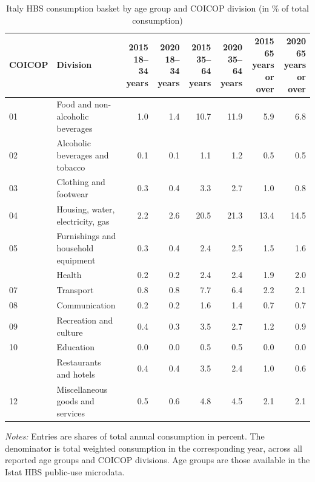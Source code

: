 \begin{landscape}
\begin{table}[H]

\caption{\label{tab:it-hbs-age-coicop}Italy HBS consumption basket by age group and COICOP division (in \% of total consumption)}
\centering
\begin{tabular}[t]{llrrrrrr}
\toprule
COICOP & Division & 2015 18--34 years & 2020 18--34 years & 2015 35--64 years & 2020 35--64 years & 2015 65 years or over & 2020 65 years or over\\
\midrule
01 & Food and non-alcoholic beverages & 1.0 & 1.4 & 10.7 & 11.9 & 5.9 & 6.8\\
02 & Alcoholic beverages and tobacco & 0.1 & 0.1 & 1.1 & 1.2 & 0.5 & 0.5\\
03 & Clothing and footwear & 0.3 & 0.4 & 3.3 & 2.7 & 1.0 & 0.8\\
04 & Housing, water, electricity, gas & 2.2 & 2.6 & 20.5 & 21.3 & 13.4 & 14.5\\
05 & Furnishings and household equipment & 0.3 & 0.4 & 2.4 & 2.5 & 1.5 & 1.6\\
\addlinespace
06 & Health & 0.2 & 0.2 & 2.4 & 2.4 & 1.9 & 2.0\\
07 & Transport & 0.8 & 0.8 & 7.7 & 6.4 & 2.2 & 2.1\\
08 & Communication & 0.2 & 0.2 & 1.6 & 1.4 & 0.7 & 0.7\\
09 & Recreation and culture & 0.4 & 0.3 & 3.5 & 2.7 & 1.2 & 0.9\\
10 & Education & 0.0 & 0.0 & 0.5 & 0.5 & 0.0 & 0.0\\
\addlinespace
11 & Restaurants and hotels & 0.4 & 0.4 & 3.5 & 2.4 & 1.0 & 0.6\\
12 & Miscellaneous goods and services & 0.5 & 0.6 & 4.8 & 4.5 & 2.1 & 2.1\\
\bottomrule
\end{tabular}
\end{table}
\begin{flushleft}
\footnotesize{\emph{Notes:} Entries are shares of total annual consumption in percent. The denominator is total weighted consumption in the corresponding year, across all reported age groups and COICOP divisions. Age groups are those available in the Istat HBS public-use microdata.}
\end{flushleft}
\end{landscape}
